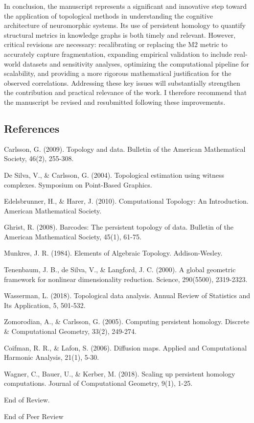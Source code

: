 \documentclass{article}
\begin{document}
In conclusion, the manuscript represents a significant and innovative step toward the application of topological methods in understanding the cognitive architecture of neuromorphic systems. Its use of persistent homology to quantify structural metrics in knowledge graphs is both timely and relevant. However, critical revisions are necessary: recalibrating or replacing the M2 metric to accurately capture fragmentation, expanding empirical validation to include real-world datasets and sensitivity analyses, optimizing the computational pipeline for scalability, and providing a more rigorous mathematical justification for the observed correlations. Addressing these key issues will substantially strengthen the contribution and practical relevance of the work. I therefore recommend that the manuscript be revised and resubmitted following these improvements.

\hrulefill
\subsection{References}

Carlsson, G. (2009). Topology and data. Bulletin of the American Mathematical Society, 46(2), 255-308.

De Silva, V., \& Carlsson, G. (2004). Topological estimation using witness complexes. Symposium on Point-Based Graphics.

Edelsbrunner, H., \& Harer, J. (2010). Computational Topology: An Introduction. American Mathematical Society.

Ghrist, R. (2008). Barcodes: The persistent topology of data. Bulletin of the American Mathematical Society, 45(1), 61-75.

Munkres, J. R. (1984). Elements of Algebraic Topology. Addison-Wesley.

Tenenbaum, J. B., de Silva, V., \& Langford, J. C. (2000). A global geometric framework for nonlinear dimensionality reduction. Science, 290(5500), 2319-2323.

Wasserman, L. (2018). Topological data analysis. Annual Review of Statistics and Its Application, 5, 501-532.

Zomorodian, A., \& Carlsson, G. (2005). Computing persistent homology. Discrete \& Computational Geometry, 33(2), 249-274.

Coifman, R. R., \& Lafon, S. (2006). Diffusion maps. Applied and Computational Harmonic Analysis, 21(1), 5-30.

Wagner, C., Bauer, U., \& Kerber, M. (2018). Scaling up persistent homology computations. Journal of Computational Geometry, 9(1), 1-25.

\hrulefill
End of Review.

\hrulefill
End of Peer Review
\end{document}
